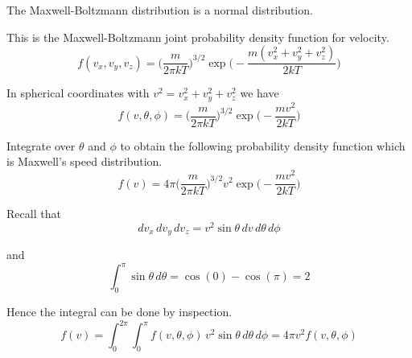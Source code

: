 \documentclass[12pt]{article}
\begin{document}
The Maxwell-Boltzmann distribution is a normal distribution.

\bigskip
This is the Maxwell-Boltzmann joint probability density function for velocity.
\begin{equation*}
f(v_x,v_y,v_z)=
\biggl(\frac{m}{2\pi kT}\biggr)^{3/2}
\exp\biggl(-\frac{m(v_x^2+v_y^2+v_z^2)}{2kT}\biggr)
\end{equation*}

In spherical coordinates with $v^2=v_x^2+v_y^2+v_z^2$ we have
\begin{equation*}
f(v,\theta,\phi)=
\biggl(\frac{m}{2\pi kT}\biggr)^{3/2}
\exp\biggl(-\frac{mv^2}{2kT}\biggr)
\end{equation*}

Integrate over $\theta$ and $\phi$
to obtain the following probability density function
which is Maxwell's speed distribution.
\begin{equation*}
f(v)=4\pi\biggl(\frac{m}{2\pi kT}\biggr)^{3/2}
v^2\exp\biggl(-\frac{mv^2}{2kT}\biggr)
\end{equation*}

Recall that
\begin{equation*}
dv_x\,dv_y\,dv_z=v^2\sin\theta\,dv\,d\theta\,d\phi
\end{equation*}

and
\begin{equation*}
\int_0^\pi\sin\theta\,d\theta=\cos(0)-\cos(\pi)=2
\end{equation*}

Hence the integral can be done by inspection.
\begin{equation*}
f(v)=\int_0^{2\pi}\int_0^\pi f(v,\theta,\phi)\,v^2\sin\theta\,d\theta\,d\phi
=4\pi v^2f(v,\theta,\phi)
\end{equation*}

\end{document}

